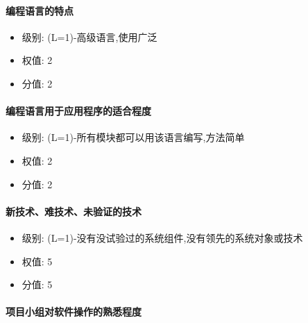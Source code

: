 \documentclass[hyperref, a4paper]{ctexart}
\providecommand{\tightlist}{%
  \setlength{\itemsep}{0pt}\setlength{\parskip}{0pt}}
\let\oldparagraph\paragraph
\renewcommand{\paragraph}[1]{\oldparagraph{#1}\mbox{}}
\begin{document}
\hypertarget{ux7f16ux7a0bux8bedux8a00ux7684ux7279ux70b9}{%
\paragraph{编程语言的特点}\label{ux7f16ux7a0bux8bedux8a00ux7684ux7279ux70b9}}

\begin{itemize}
\tightlist
\item
  级别: (L=1)-高级语言,使用广泛
\item
  权值: 2
\item
  分值: 2
\end{itemize}

\hypertarget{ux7f16ux7a0bux8bedux8a00ux7528ux4e8eux5e94ux7528ux7a0bux5e8fux7684ux9002ux5408ux7a0bux5ea6}{%
\paragraph{编程语言用于应用程序的适合程度}\label{ux7f16ux7a0bux8bedux8a00ux7528ux4e8eux5e94ux7528ux7a0bux5e8fux7684ux9002ux5408ux7a0bux5ea6}}

\begin{itemize}
\tightlist
\item
  级别: (L=1)-所有模块都可以用该语言编写,方法简单
\item
  权值: 2
\item
  分值: 2
\end{itemize}

\hypertarget{ux65b0ux6280ux672fux96beux6280ux672fux672aux9a8cux8bc1ux7684ux6280ux672f}{%
\paragraph{新技术、难技术、未验证的技术}\label{ux65b0ux6280ux672fux96beux6280ux672fux672aux9a8cux8bc1ux7684ux6280ux672f}}

\begin{itemize}
\tightlist
\item
  级别: (L=1)-没有没试验过的系统组件,没有领先的系统对象或技术
\item
  权值: 5
\item
  分值: 5
\end{itemize}

\hypertarget{ux9879ux76eeux5c0fux7ec4ux5bf9ux8f6fux4ef6ux64cdux4f5cux7684ux719fux6089ux7a0bux5ea6}{%
\paragraph{项目小组对软件操作的熟悉程度}\label{ux9879ux76eeux5c0fux7ec4ux5bf9ux8f6fux4ef6ux64cdux4f5cux7684ux719fux6089ux7a0bux5ea6}}
\end{document}
